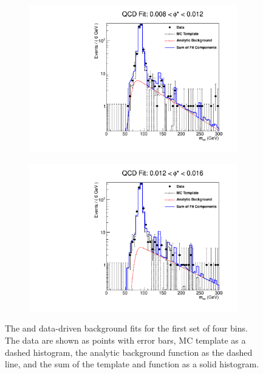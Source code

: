\begin{figure}[!htbp]
\begin{subfigure}[b]{\SideBySidePlotWidth}
        \label{fig:qcd_fit_02}
    \end{subfigure}
    \begin{subfigure}[b]{\SideBySidePlotWidth}
        \includegraphics[width=\linewidth]{figures/qcd_fits/qcd_fit_plot_for_03.pdf}
        \label{fig:qcd_fit_03}
    \end{subfigure}%
    \begin{subfigure}[b]{\SideBySidePlotWidth}
        \includegraphics[width=\linewidth]{figures/qcd_fits/qcd_fit_plot_for_04.pdf}
        \label{fig:qcd_fit_04}
    \end{subfigure}
    \caption[
        The \QCDjets and \wjets data-driven background fits for the first set of
        four \phistar bins.
    ]{
        The \QCDjets and \wjets data-driven background fits for the first set of
        four \phistar bins. The data are shown as points with error bars, MC
        template as a dashed histogram, the analytic background function as the
        dashed line, and the sum of the template and function as a solid
        histogram.
    }
    \label{fig:qcd_many_1}
\end{figure}

